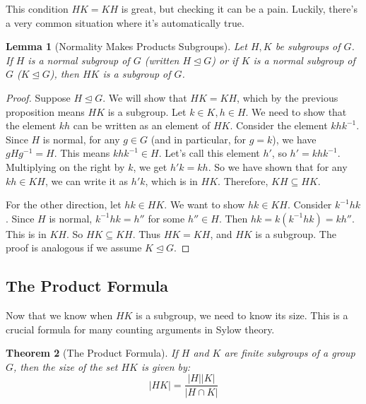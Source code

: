 \documentclass[12pt,a4paper]{article}
\theoremstyle{plain} %
\newtheorem{theorem}{Theorem}[section]
\newtheorem{lemma}[theorem]{Lemma}
\theoremstyle{definition} %
\theoremstyle{remark} %
\begin{document}
This condition $HK=KH$ is great, but checking it can be a pain. Luckily, there's a very common situation where it's automatically true.

\begin{lemma}[Normality Makes Products Subgroups]
Let $H, K$ be subgroups of $G$. If $H$ is a normal subgroup of $G$ (written $H \unlhd G$) or if $K$ is a normal subgroup of $G$ ($K \unlhd G$), then $HK$ is a subgroup of $G$.
\end{lemma}
\begin{proof}
Suppose $H \unlhd G$. We will show that $HK=KH$, which by the previous proposition means $HK$ is a subgroup. Let $k \in K, h \in H$. We need to show that the element $kh$ can be written as an element of $HK$.
Consider the element $khk^{-1}$. Since $H$ is normal, for any $g \in G$ (and in particular, for $g=k$), we have $gHg^{-1} = H$. This means $khk^{-1} \in H$. Let's call this element $h'$, so $h' = khk^{-1}$.
Multiplying on the right by $k$, we get $h'k = kh$.
So we have shown that for any $kh \in KH$, we can write it as $h'k$, which is in $HK$. Therefore, $KH \subseteq HK$.

For the other direction, let $hk \in HK$. We want to show $hk \in KH$. Consider $k^{-1}hk$. Since $H$ is normal, $k^{-1}hk = h''$ for some $h'' \in H$. Then $hk = k(k^{-1}hk) = kh''$. This is in $KH$. So $HK \subseteq KH$.
Thus $HK=KH$, and $HK$ is a subgroup. The proof is analogous if we assume $K \unlhd G$.
\end{proof}

\subsection{The Product Formula}
Now that we know when $HK$ is a subgroup, we need to know its size. This is a crucial formula for many counting arguments in Sylow theory.

\begin{theorem}[The Product Formula]
If $H$ and $K$ are finite subgroups of a group $G$, then the size of the set $HK$ is given by:
\[
|HK| = \frac{|H| |K|}{|H \cap K|}
\]
\end{theorem}
\end{document}
